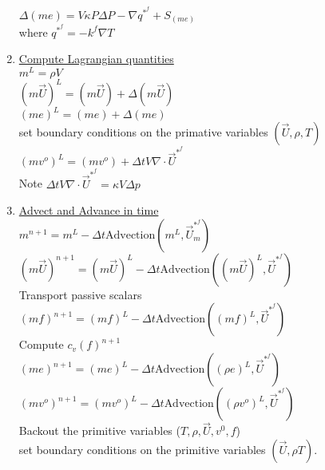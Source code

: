 \documentclass[fleqn]{article}
\newcommand{\bigS}[1]   {\ensuremath{S_{#1}}  }
\newcommand{\U}         {{\vec{U}}}
\newcommand{\delt}      {\ensuremath{\Delta{t}} }
\begin{document}
\begin{enumerate}
 $\Delta(me) =  
    V \kappa P \Delta{P}
    - \nabla q^{*^f} 
    + \bigS{(m e)}$\\
where $q^{*^f} = -k^f \nabla T$
%
\item \underline{Compute Lagrangian quantities}\\
    $m^L     = {\rho}V$ \\
    $(m\U)^L = (m\U) + \Delta(m\U)$ \\
    $(m e)^L = (m e) + \Delta(m e)$ \\
    set boundary conditions on the primative variables $(\U, \rho, T)$
%
\newpage
{}\\
    $(mv^o)^L = (mv^o) + \delt V \nabla \cdot  \vec{U}^{*^{f}}$ \\
    Note $\delt V \nabla \cdot  \vec{U}^{*^{f}} = \kappa V \Delta{p}$
%
\item \underline{Advect and Advance in time}\\
$ m^{n+1}     = m^L 
                  - \delt\text{Advection}(m^L, \U_ m^{*^{f}})$ \\
$(m \U)^{n+1} = (m \U)^L 
                   - \delt\text{Advection}((m \U)^L, \vec{U}^{*^{f}})$\\
Transport passive scalars\\
$(m f)^{n+1} = (m f)^L 
                   - \delt\text{Advection}((m f)^L, \vec{U}^{*^{f}})$\\
Compute $c_v(f)^{n+1}$\\
$(me)^{n+1}   = (me)^L       
                   - \delt\text{Advection}((\rho  e)^L, \vec{U}^{*^{f}}) $\\
$(mv^o)^{n+1}   = (mv^o)^L       
                   - \delt\text{Advection}((\rho  v^o)^L, \vec{U}^{*^{f}})$ \\
Backout the primitive variables ($T, \rho, \U, v^0, f$)\\
set boundary conditions on the primitive variables $(\U, \rho T)$.
\end{enumerate}
\end{document}
